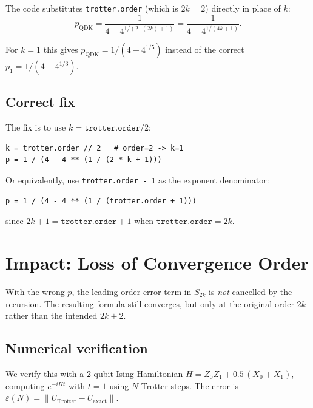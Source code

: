\documentclass[11pt]{article}
\begin{document}
The code substitutes \texttt{trotter.order} (which is $2k = 2$) directly in
place of $k$:
\begin{equation}
  p_{\text{QDK}} = \frac{1}{4 - 4^{1/(2 \cdot (2k) + 1)}} = \frac{1}{4 - 4^{1/(4k+1)}}.
\end{equation}

For $k=1$ this gives $p_{\text{QDK}} = 1/(4-4^{1/5})$ instead of the correct
$p_1 = 1/(4-4^{1/3})$.

\subsection{Correct fix}

The fix is to use $k = \texttt{trotter.order} / 2$:
\begin{lstlisting}
k = trotter.order // 2   # order=2 -> k=1
p = 1 / (4 - 4 ** (1 / (2 * k + 1)))
\end{lstlisting}

\noindent
Or equivalently, use \texttt{trotter.order - 1} as the exponent denominator:
\begin{lstlisting}
p = 1 / (4 - 4 ** (1 / (trotter.order + 1)))
\end{lstlisting}

\noindent
since $2k + 1 = \texttt{trotter.order} + 1$ when $\texttt{trotter.order} = 2k$.

\section{Impact: Loss of Convergence Order}

With the wrong $p$, the leading-order error term in $S_{2k}$ is \emph{not}
cancelled by the recursion.  The resulting formula still converges, but only at
the original order $2k$ rather than the intended $2k+2$.

\subsection{Numerical verification}

We verify this with a 2-qubit Ising Hamiltonian
$H = Z_0 Z_1 + 0.5\,(X_0 + X_1)$, computing $e^{-iHt}$ with $t = 1$ using
$N$ Trotter steps.  The error is
$\varepsilon(N) = \lVert U_{\text{Trotter}} - U_{\text{exact}} \rVert$.
\end{document}
